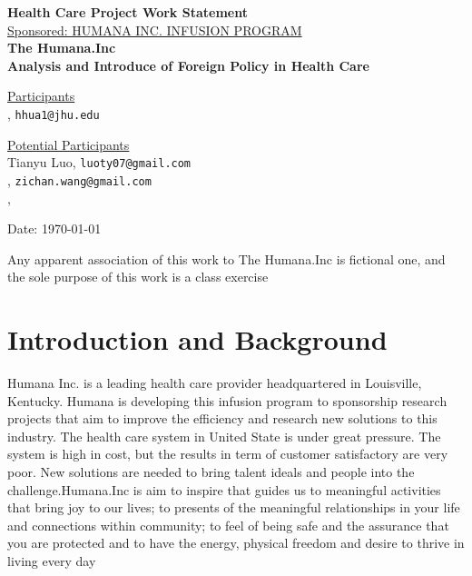 \documentclass[12pt,letterpaper]{article}
\theoremstyle{definition}
\begin{document}
\def\shiftdowna{0.32in}  %
\def\shiftdownb{0.22in}  %


\begin{center}
\textbf{{\large Health Care Project Work Statement}}\\


\vspace \shiftdowna
\underline {Sponsored: HUMANA INC. INFUSION PROGRAM }\\ 
\vspace{5pt}
\textbf{{\large The Humana.Inc}}\\


\vspace \shiftdowna
\textbf{{\large Analysis and Introduce of Foreign Policy in Health Care }}


\vspace{0.35in}
\vspace \shiftdownb
\underline {Participants} \\
\vspace{5pt}
, \texttt{hhua1@jhu.edu}

\vspace \shiftdownb
\underline {Potential Participants}\\
\vspace{5pt}
Tianyu Luo, \texttt{luoty07@gmail.com} \\
\vspace{3pt}
, \texttt{zichan.wang@gmail.com} \\
\vspace{3pt}
\text{}, \texttt{}

\vspace \shiftdowna
Date: \today

\end{center}

\vfill  
\footnoterule
\noindent \small{Any apparent association of this work to The Humana.Inc is
fictional one, and the sole purpose of this work is a class exercise}

\newpage

\section{Introduction and Background} 
Humana Inc. is a leading health care provider headquartered in Louisville, Kentucky. Humana is developing this infusion program to sponsorship research projects that aim to improve the efficiency and research new solutions to this industry. The health care system in United State is under great pressure. The system is high in cost, but the results in term of customer satisfactory are very poor. New solutions are needed to bring talent ideals and people into the challenge.Humana.Inc is aim to inspire that guides us to meaningful activities that bring joy to our lives; to presents of the meaningful relationships in your life and connections within community; to feel of being safe and the assurance that you are protected and to have the energy, physical freedom and desire to thrive in living every day
\end{document}

